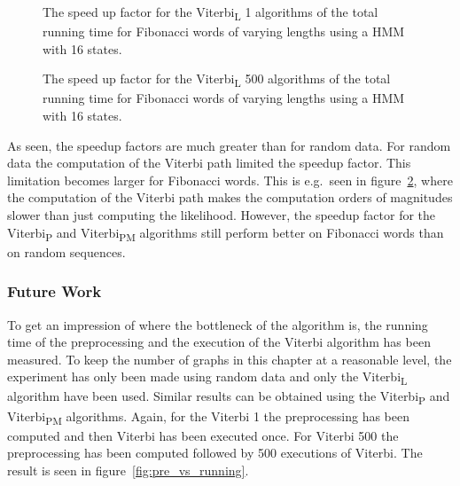 \begin{figure}
  \centering
  
  \caption{The speed up factor for the Viterbi\textsubscript{L} 1 algorithms of the total
    running time for Fibonacci words of varying
    lengths using a HMM with 16 states.}
  \label{fig:fib_compressed_1_speedup_vs_sequence_length}
\end{figure}

\begin{figure}
  \centering
  
  \caption{The speed up factor for the Viterbi\textsubscript{L} 500 algorithms of the total
    running time for Fibonacci words of varying
    lengths using a HMM with 16 states.}
  \label{fig:fib_compressed_500_speedup_vs_sequence_length}
\end{figure}

As seen, the speedup factors are much greater than for random data. For random
data the computation of the Viterbi path limited the speedup factor. This
limitation becomes larger for Fibonacci words. This is e.g.\ seen in
figure~\ref{fig:fib_compressed_500_speedup_vs_sequence_length}, where the
computation of the Viterbi path makes the computation orders of magnitudes
slower than just computing the likelihood. However, the speedup factor for the
Viterbi\textsubscript{P} and Viterbi\textsubscript{PM} algorithms still perform
better on Fibonacci words than on random sequences.

\subsubsection{Future Work}

To get an impression of where the bottleneck of the algorithm is, the running
time of the preprocessing and the execution of the Viterbi algorithm has been
measured. To keep the number of graphs in this chapter at a reasonable level,
the experiment has only been made using random data and only the
Viterbi\textsubscript{L} algorithm have been used. Similar results can be
obtained using the Viterbi\textsubscript{P} and Viterbi\textsubscript{PM}
algorithms. Again, for the Viterbi 1 the preprocessing has been computed and then
Viterbi has been executed once. For Viterbi 500 the preprocessing has been computed
followed by 500 executions of Viterbi. The result is seen in
figure~\ref{fig:pre_vs_running}.

